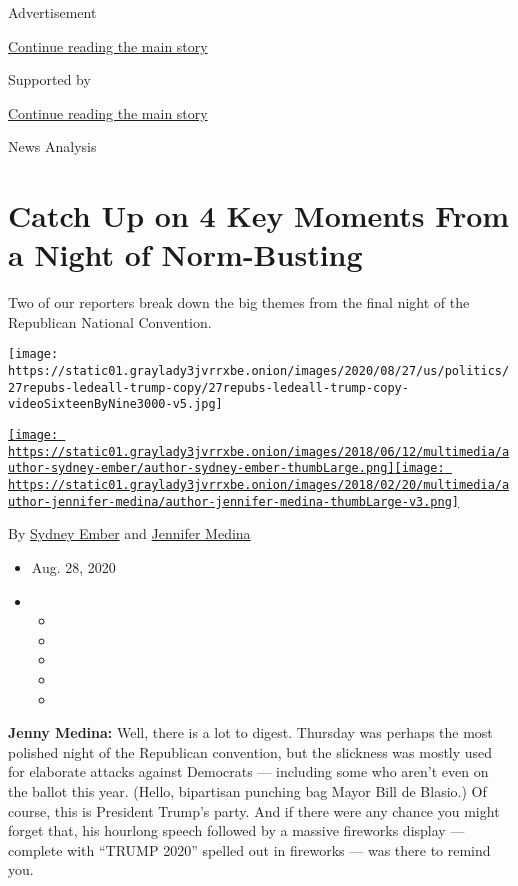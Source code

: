 Advertisement

\protect\hyperlink{after-top}{Continue reading the main story}

Supported by

\protect\hyperlink{after-sponsor}{Continue reading the main story}

News Analysis

\hypertarget{catch-up-on-4-key-moments-from-a-night-of-norm-busting}{%
\section{Catch Up on 4 Key Moments From a Night of
Norm-Busting}\label{catch-up-on-4-key-moments-from-a-night-of-norm-busting}}

Two of our reporters break down the big themes from the final night of
the Republican National Convention.

\texttt{[image: https://static01.graylady3jvrrxbe.onion/images/2020/08/27/us/politics/27repubs-ledeall-trump-copy/27repubs-ledeall-trump-copy-videoSixteenByNine3000-v5.jpg]}

\href{https://www.nytimes3xbfgragh.onion/by/sydney-ember}{\texttt{[image: https://static01.graylady3jvrrxbe.onion/images/2018/06/12/multimedia/author-sydney-ember/author-sydney-ember-thumbLarge.png]}}\href{https://www.nytimes3xbfgragh.onion/by/jennifer-medina}{\texttt{[image: https://static01.graylady3jvrrxbe.onion/images/2018/02/20/multimedia/author-jennifer-medina/author-jennifer-medina-thumbLarge-v3.png]}}

By \href{https://www.nytimes3xbfgragh.onion/by/sydney-ember}{Sydney
Ember} and
\href{https://www.nytimes3xbfgragh.onion/by/jennifer-medina}{Jennifer
Medina}

\begin{itemize}
\item
  Aug. 28, 2020
\item
  \begin{itemize}
  \item
  \item
  \item
  \item
  \item
  \end{itemize}
\end{itemize}

\textbf{Jenny Medina:} Well, there is a lot to digest. Thursday was
perhaps the most polished night of the Republican convention, but the
slickness was mostly used for elaborate attacks against Democrats ---
including some who aren't even on the ballot this year. (Hello,
bipartisan punching bag Mayor Bill de Blasio.) Of course, this is
President Trump's party. And if there were any chance you might forget
that, his hourlong speech followed by a massive fireworks display ---
complete with ``TRUMP 2020'' spelled out in fireworks --- was there to
remind you.

